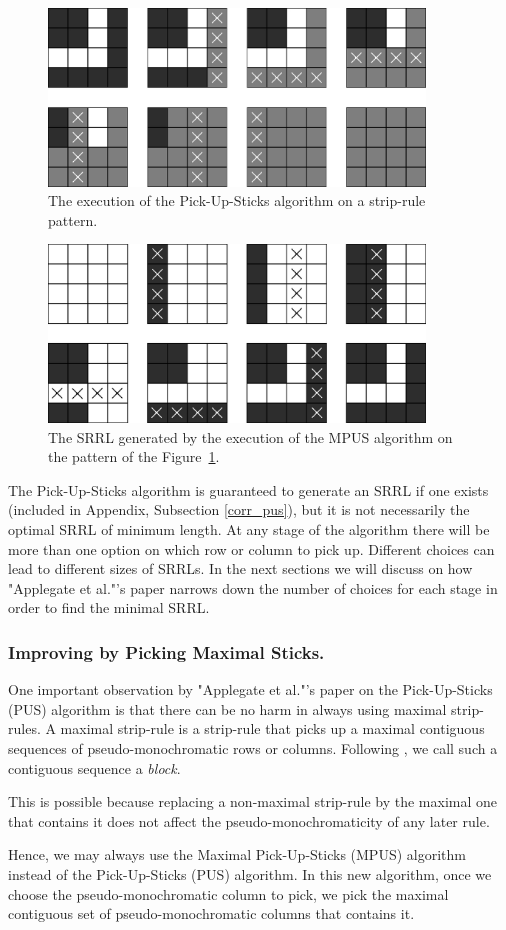 \begin{figure}[h]
\centering
\includegraphics[width=10cm]{pick_up_sticks_example}
\caption{The execution of the Pick-Up-Sticks algorithm on a strip-rule pattern.}
\label{fig:pick_up_sticks_example}
\end{figure}

\begin{figure}[h]
\centering
\includegraphics[width=10cm]{pick_up_sticks_srrl}
\caption{The SRRL generated by the execution of the MPUS algorithm on the pattern of the Figure~\ref{fig:pick_up_sticks_example}.}
\label{fig:pick_up_sticks_srrl}
\end{figure}

The Pick-Up-Sticks algorithm is guaranteed to generate an SRRL if one exists
\cite{ACJKLW07} (included in Appendix, Subsection \ref{corr_pus}), but it is not necessarily the optimal SRRL of minimum length. At any stage of the algorithm there will be more than one option on which row or column to pick up. Different choices can lead to different sizes of SRRLs. In the next sections we will discuss on how "Applegate et al."'s paper narrows down the number of choices for each stage in order to find the minimal SRRL.

\subsubsection{Improving by Picking Maximal Sticks.}

One important observation by "Applegate et al."'s paper on the Pick-Up-Sticks (PUS) algorithm is that there can be no harm in always using maximal strip-rules. A maximal strip-rule is a strip-rule that picks up a maximal contiguous sequences of pseudo-monochromatic rows or columns. Following \cite{ACJKLW07},
we call such a contiguous sequence a {\em block}.

This is possible because replacing a non-maximal strip-rule by the maximal one that contains it does not affect the pseudo-monochromaticity of any later rule.

Hence, we may always use the Maximal Pick-Up-Sticks (MPUS) algorithm instead of the Pick-Up-Sticks (PUS) algorithm. In this new algorithm, once we choose the pseudo-monochromatic column to pick, we pick the maximal contiguous set of pseudo-monochromatic columns that contains it.
